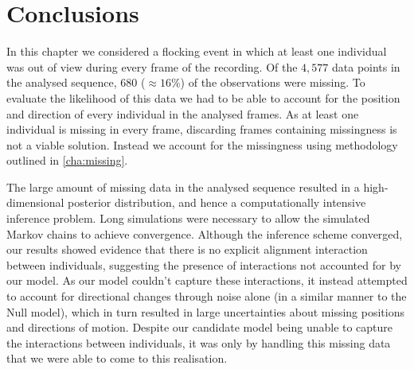 \section*{Conclusions}

In this chapter we considered a flocking event in which at least one individual
was out of view during every frame of the recording. Of the $4,577$ data
points in the analysed sequence, $680$ ($\approx16\%$) of the observations were
missing. To evaluate the likelihood of this data we had to be able to account
for the position and direction of every individual in the analysed frames. As
at least one individual is missing in every frame, discarding frames containing
missingness is not a viable solution. Instead we account for the missingness
using methodology outlined in \cref{cha:missing}.

The large amount of missing data in the analysed sequence resulted in a
high-dimensional posterior distribution, and hence a computationally intensive
inference problem. Long simulations were necessary to allow the simulated
Markov chains to achieve convergence. Although the inference scheme converged,
our results showed evidence that there is no explicit alignment interaction
between individuals, suggesting the presence of interactions not accounted for
by our model. As our model couldn't capture these interactions, it instead
attempted to account for directional changes through noise alone (in a similar
manner to the Null model), which in turn resulted in large uncertainties about
missing positions and directions of motion. Despite our candidate model being
unable to capture the interactions between individuals, it was only by handling
this missing data that we were able to come to this realisation.
